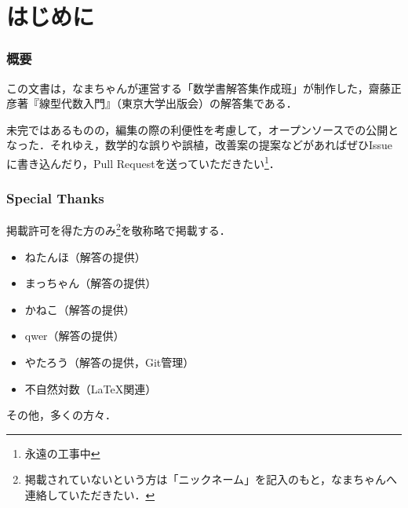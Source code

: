 \documentclass[a4paper,10pt,fleqn]{ltjsarticle}
\begin{document}


\thispagestyle{empty}

\newpage
{}
\pagecolor{white}

\begin{multicols}{3}
    \tableofcontents
\end{multicols}

\newpage

\part*{はじめに}

\section*{概要}

この文書は，なまちゃんが運営する「数学書解答集作成班」が制作した，齋藤正彦著『線型代数入門』（東京大学出版会）の解答集である．

未完ではあるものの，編集の際の利便性を考慮して，オープンソースでの公開となった．それゆえ，数学的な誤りや誤植，改善案の提案などがあればぜひIssueに書き込んだり，Pull Requestを送っていただきたい\footnote{永遠の工事中}．


\section*{Special Thanks}

掲載許可を得た方のみ\footnote{掲載されていないという方は「ニックネーム」を記入のもと，なまちゃんへ連絡していただきたい．}を敬称略で掲載する．
\begin{itemize}
    \item ねたんほ（解答の提供）
    \item まっちゃん（解答の提供）
    \item かねこ（解答の提供）
    \item qwer（解答の提供）
    \item やたろう（解答の提供，Git管理）
    \item 不自然対数（\LaTeX 関連）
\end{itemize}

その他，多くの方々．
\end{document}
